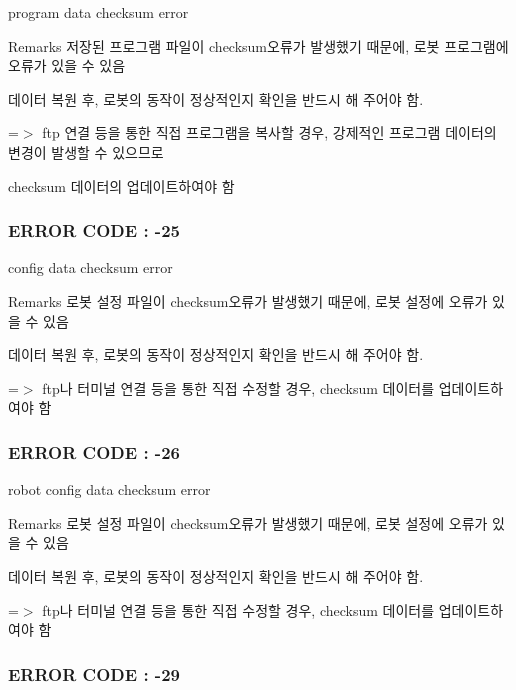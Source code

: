 program data checksum error \begin{DoxyRemark}{Remarks}
저장된 프로그램 파일이 checksum오류가 발생했기 때문에, 로봇 프로그램에 오류가 있을 수 있음 \par
 데이터 복원 후, 로봇의 동작이 정상적인지 확인을 반드시 해 주어야 함. \par
 =$>$ ftp 연결 등을 통한 직접 프로그램을 복사할 경우, 강제적인 프로그램 데이터의 변경이 발생할 수 있으므로\par
 checksum 데이터의 업데이트하여야 함
\end{DoxyRemark}


 \subsubsection*{E\-R\-R\-O\-R C\-O\-D\-E \-: -\/25 }

config data checksum error \begin{DoxyRemark}{Remarks}
로봇 설정 파일이 checksum오류가 발생했기 때문에, 로봇 설정에 오류가 있을 수 있음 \par
 데이터 복원 후, 로봇의 동작이 정상적인지 확인을 반드시 해 주어야 함. \par
 =$>$ ftp나 터미널 연결 등을 통한 직접 수정할 경우, checksum 데이터를 업데이트하여야 함 \par

\end{DoxyRemark}


 \subsubsection*{E\-R\-R\-O\-R C\-O\-D\-E \-: -\/26 }

robot config data checksum error \begin{DoxyRemark}{Remarks}
로봇 설정 파일이 checksum오류가 발생했기 때문에, 로봇 설정에 오류가 있을 수 있음 \par
 데이터 복원 후, 로봇의 동작이 정상적인지 확인을 반드시 해 주어야 함. \par
 =$>$ ftp나 터미널 연결 등을 통한 직접 수정할 경우, checksum 데이터를 업데이트하여야 함 \par

\end{DoxyRemark}


 \subsubsection*{E\-R\-R\-O\-R C\-O\-D\-E \-: -\/29 }

